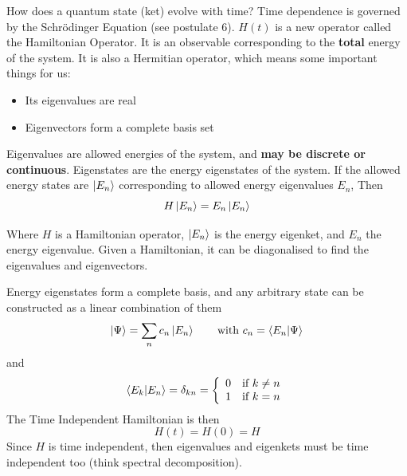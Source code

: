 \documentclass[english, 11pt]{article}
\begin{document}
    How does a quantum state (ket) evolve with time? Time dependence is governed by the Schrödinger Equation (see postulate 6). $H(t)$ is a new operator called the Hamiltonian Operator.
    It is an observable corresponding to the \textbf{total} energy of the system. It is also a Hermitian operator, which means some important things for us:
    \begin{itemize}
      \item Its eigenvalues are real
      \item Eigenvectors form a complete basis set
    \end{itemize}
    Eigenvalues are allowed energies of the system, and \textbf{may be discrete or continuous}. Eigenstates are the energy eigenstates of the system. If the allowed energy states are $\left|E_n\right\rangle$ corresponding to allowed energy eigenvalues $E_n$, Then
    \[ H\left|E_n\right\rangle = E_n\left|E_n\right\rangle \]

    Where $H$ is a Hamiltonian operator, $\left|E_n\right\rangle$ is the energy eigenket, and $E_n$ the energy eigenvalue. Given a Hamiltonian, it can be diagonalised to find the eigenvalues and eigenvectors.
    \newline

    Energy eigenstates form a complete basis, and any arbitrary state can be constructed as a linear combination of them
    \[ \kpsi = \sum_n c_n\ket{E_n} \mbox{ \ \ \ \ \ with } c_n = \braket{E_n}{\Psi} \]
    and
    \[ \braket{E_k}{E_n} = \delta_{kn} = \piecewise{0}{if $k \not = n$}{1}{if $k = n$} \]
    The Time Independent Hamiltonian is then
    \[ H(t) = H(0) = H \]
    Since $H$ is time independent, then eigenvalues and eigenkets must be time independent too (think spectral decomposition).
    \newline
\end{document}
